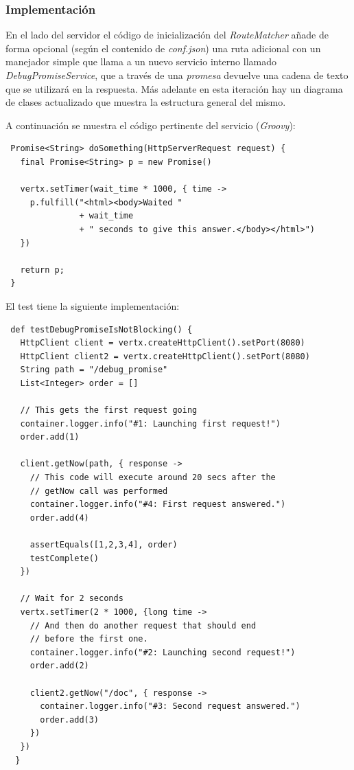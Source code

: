 \subsubsection{Implementación}

En el lado del servidor el código de inicialización del \emph{RouteMatcher} añade
de forma opcional (según el contenido de \emph{conf.json}) una ruta adicional 
con un manejador simple que llama a un nuevo servicio interno llamado
\emph{DebugPromiseService}, que a través de una \emph{promesa} devuelve una
cadena de texto que se utilizará en la respuesta. Más adelante en esta iteración
hay un diagrama de clases actualizado que muestra la estructura general del mismo.

A continuación se muestra el código pertinente del servicio (\emph{Groovy}):

\begin{verbatim}
 Promise<String> doSomething(HttpServerRequest request) {
   final Promise<String> p = new Promise()

   vertx.setTimer(wait_time * 1000, { time ->
     p.fulfill("<html><body>Waited " 
               + wait_time 
               + " seconds to give this answer.</body></html>")
   })

   return p;
 }
\end{verbatim}

El test tiene la siguiente implementación:

\begin{verbatim}
 def testDebugPromiseIsNotBlocking() {
   HttpClient client = vertx.createHttpClient().setPort(8080)
   HttpClient client2 = vertx.createHttpClient().setPort(8080)
   String path = "/debug_promise"
   List<Integer> order = []

   // This gets the first request going
   container.logger.info("#1: Launching first request!")
   order.add(1)

   client.getNow(path, { response ->
     // This code will execute around 20 secs after the 
     // getNow call was performed
     container.logger.info("#4: First request answered.")
     order.add(4)

     assertEquals([1,2,3,4], order)
     testComplete()
   })

   // Wait for 2 seconds
   vertx.setTimer(2 * 1000, {long time ->
     // And then do another request that should end 
     // before the first one.
     container.logger.info("#2: Launching second request!")
     order.add(2)

     client2.getNow("/doc", { response ->
       container.logger.info("#3: Second request answered.")
       order.add(3)
     })
   })
  }
\end{verbatim}

